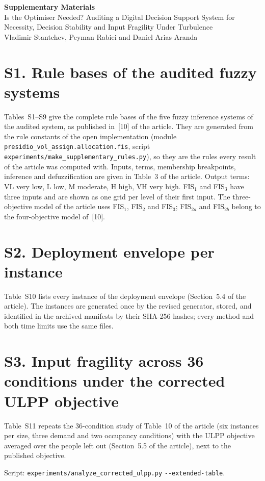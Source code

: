\documentclass[11pt,a4paper]{article}
\begin{document}
\begin{center}
{\Large\bfseries Supplementary Materials}\\[6pt]
Is the Optimiser Needed? Auditing a Digital Decision Support System for Necessity, Decision
Stability and Input Fragility Under Turbulence\\[4pt]
Vladimir Stantchev, Peyman Rabiei and Daniel Arias-Aranda
\end{center}

\section*{S1. Rule bases of the audited fuzzy systems}
Tables~S1--S9 give the complete rule bases of the five fuzzy inference systems of the audited
system, as published in~[10] of the article. They are generated from the rule constants of
the open implementation (module \nolinkurl{presidio_vol_assign.allocation.fis}, script
\nolinkurl{experiments/make_supplementary_rules.py}), so they are the rules every result of the
article was computed with. Inputs, terms, membership breakpoints, inference and
defuzzification are given in Table~3 of the article. Output terms: VL very low, L low, M
moderate, H high, VH very high. FIS$_1$ and FIS$_3$ have three inputs and are shown as one
grid per level of their first input. The three-objective model of the article uses FIS$_1$,
FIS$_2$ and FIS$_3$; FIS$_{2a}$ and FIS$_{2b}$ belong to the four-objective model of~[10].



\clearpage
\section*{S2. Deployment envelope per instance}
Table~S10 lists every instance of the deployment envelope (Section~5.4 of the article). The
instances are generated once by the revised generator, stored, and identified in the archived
manifests by their SHA-256 hashes; every method and both time limits use the same files.

\setcounter{table}{9}


\clearpage
\section*{S3. Input fragility across 36 conditions under the corrected ULPP objective}
Table~S11 repeats the 36-condition study of Table~10 of the article (six instances per size,
three demand and two occupancy conditions) with the ULPP objective averaged over the people left
out (Section~5.5 of the article), next to the published objective.

Script: \nolinkurl{experiments/analyze_corrected_ulpp.py} \nolinkurl{--extended-table}.


\end{document}
